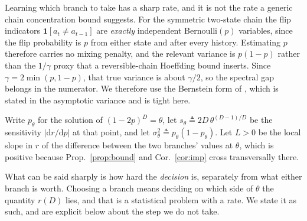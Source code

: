 Learning which branch to take has a sharp rate, and it is not the rate a generic
chain concentration bound suggests. For the symmetric two-state chain the flip
indicators $\mathbf 1[a_t\neq a_{t-1}]$ are \emph{exactly} independent
Bernoulli$(p)$ variables, since the flip probability is $p$ from either state and
after every history. Estimating $p$ therefore carries no mixing penalty, and the
relevant variance is $p(1-p)$ rather than the $1/\gamma$ proxy that a
reversible-chain Hoeffding bound inserts. Since $\gamma=2\min(p,1-p)$, that true
variance is about $\gamma/2$, so the spectral gap belongs in the numerator. We
therefore use the Bernstein form of \cite{paulin2015}, which is stated in the
asymptotic variance and is tight here.

Write $p_\theta$ for the solution of $(1-2p)^D=\theta$, let
$s_\theta\triangleq 2D\,\theta^{(D-1)/D}$ be the sensitivity
$|\mathrm{d}r/\mathrm{d}p|$ at that point, and let
$\sigma_\theta^2\triangleq p_\theta(1-p_\theta)$. Let $L>0$ be the local slope in
$r$ of the difference between the two branches' values at $\theta$, which is
positive because Prop.~\ref{prop:bound} and Cor.~\ref{cor:imp} cross transversally
there.

What can be said sharply is how hard the \emph{decision} is, separately from what
either branch is worth. Choosing a branch means deciding on which side of $\theta$
the quantity $r(D)$ lies, and that is a statistical problem with a rate. We state
it as such, and are explicit below about the step we do not take.


